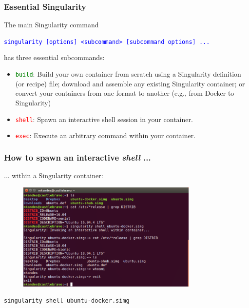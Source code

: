 \documentclass{beamer}
\begin{document}
\begin{frame}
   \frametitle{Essential Singularity}
   The main Singularity command
   \begin{center}
      \textcolor{blue}{\lstinline{singularity [options] <subcommand> [subcommand options] ...}}
   \end{center}
   has three essential subcommands:
   \begin{itemize}
      \setlength\itemsep{1.0em}
      \item \textcolor{green}{\lstinline{build}}: Build your own container
         from scratch using a Singularity definition (or recipe) file;
         download and assemble any existing Singularity container; or
         convert your containers from one format to another (e.g., from
         Docker to Singularity)
      \item \textcolor{red}{\lstinline{shell}}: Spawn an interactive shell
         session in your container.
      \item \textcolor{red}{\lstinline{exec}}: Execute an arbitrary
         command within your container.
   \end{itemize}
\end{frame}

\begin{frame}
   \frametitle{How to spawn an interactive \textit{shell} ...}
   ... within a Singularity container:
   \begin{figure}[htbp]
      \includegraphics[width=0.8\textwidth]{images/singularity-shell-docker.png}
   \end{figure}
   \lstinline{singularity shell ubuntu-docker.simg}
\end{frame}
\end{document}
